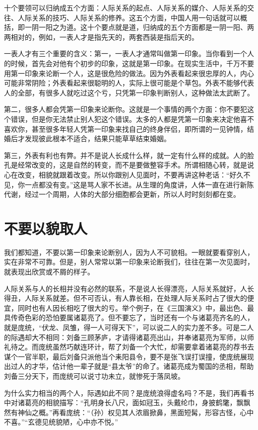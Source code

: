 \documentclass[fontset=fandol, a4paper, 12pt, openright]{ctexbook}
\begin{document}
十个要领可以归纳成五个方面：人际关系的起点、人际关系的媒介、人际关系的交往、人际关系的技巧、人际关系的修养。这五个方面，中国人用一句话就可以概括，即一阴一阳之为道。这十个要点就是道，归纳成的五个方面都是一阴一阳、两两相对的，例如，一表人才是指先天的，两套西装是指后天的。

一表人才有三个重要的含义：第一，一表人才通常叫做第一印象。当你看到一个人的时候，首先会对他有个初步的印象，这就是第一印象。在现实生活中，千万不要用第一印象来论断一个人，这是很危险的做法。因为外表看起来很忠厚的人，内心可能非常阴险；外表看起来很聪明的人，实际上很可能是个草包。外表不能够代表人的全部，有很多人就吃过这个亏，只凭第一印象判断别人，这种做法太武断了。

第二，很多人都会凭第一印象来论断你。这就是一个事情的两个方面：你不要犯这个错误，但是你无法禁止别人犯这个错误。太多的人都是凭第一印象来决定他喜不喜欢你，甚至很多年轻人凭第一印象来找自己的终身伴侣，即所谓的一见钟情，结婚后才发现彼此根本不适合，结果只能草草结束婚姻。

第三，外表有利也有弊。并不是说人长成什么样，就一定有什么样的成就。人的脸孔是经常改变的，这是自然的转变，而不是要做整容手术。所谓相随心转，就是说心在改变，相貌就跟着改变。所以你跟别人见面时，不要再讲这种老话：“好久不见，你一点都没有变。”这是骂人家不长进。从生理的角度讲，人体一直在进行新陈代谢，经过一个周期，人体的大部分细胞都会更新，所以人时时刻刻都在变。

\section{不要以貌取人}

我们都知道，不要以第一印象来论断别人，因为人不可貌相。一眼就要看穿别人，实在非常不可靠。但是，别人常常以第一印象来论断我们，往往在第一次见面时，就表现出欣赏或不屑的样子。

人际关系与人的长相并没有必然的联系，不是说人长得漂亮，人际关系就好，人长得丑，人际关系就差。但不可否认，有人靠长相，在处理人际关系时占了很大的便宜，同时也有人因长相吃了很大的亏。举个例子，在《三国演义》中，最出色、最具传奇色彩的恐怕要属诸葛亮了。但不要忘了，当时还有一个与诸葛亮齐名的人，就是庞统，“伏龙、凤雏，得一人可得天下”，可以说二人的实力差不多。可是二人的际遇却大不相同：刘备三顾茅庐，才请得诸葛亮出山，并奉诸葛亮为军师，以师礼待之。而庞统虽然巧献连环计，帮了刘备一个大忙，却需要拿着诸葛亮的荐书去谋个一官半职，最后刘备只派他当个耒阳县令，要不是张飞误打误撞，使庞统展现出过人的才华，估计他一辈子就是“县太爷”的命了。诸葛亮成为蜀国的丞相，帮助刘备三分天下，而庞统可以说寸功未立，就惨死于落凤坡。

为什么实力相当的两个人，际遇如此不同？是庞统浪得虚名吗？不是，我们再看书中对诸葛亮的相貌描写：“孔明身长八尺，面如冠玉，头戴纶巾，身披鹤氅，飘飘然有神仙之概。”再看庞统：“（孙）权见其人浓眉掀鼻，黑面短髯，形容古怪，心中不喜。”“玄德见统貌陋，心中亦不悦。”
\end{document}
